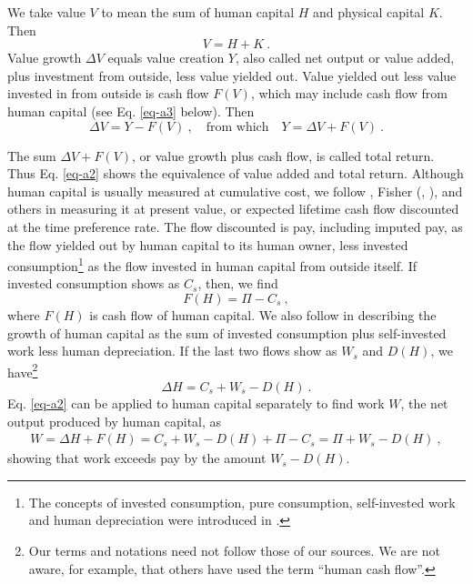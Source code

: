 %
We take value $V$ to mean the sum of human capital $H$ and physical capital $K$. Then
\begin{equation}
V = H + K\ . \label{eq-a1}
\end{equation}
%
Value growth $\Delta V$ equals value creation $Y$, also called net output or value added, plus investment from outside, less value yielded out. Value yielded out less value invested in from outside is cash flow $F(V)$, which may include cash flow from human capital (see Eq. \ref{eq-a3} below). Then
\begin{equation}
\Delta V = Y - F(V) \ , \quad \text{from which} \quad Y = \Delta V + F(V) \ . \label{eq-a2}
\end{equation}

The sum $\Delta V + F(V)$, or value growth plus cash flow, is called total return. Thus Eq. \eqref{eq-a2} shows the equivalence of value added and total return.
Although human capital is usually measured at cumulative cost, we follow \cite{petty1664verbum}, Fisher (\citeyear{fisher1907}, \citeyear{fisher1930}), \cite{mincer1958} and others in measuring it at present value, or expected lifetime cash flow discounted at the time preference rate. The flow discounted is pay, including imputed pay, as the flow yielded out by human capital to its human owner, less invested consumption\footnote{The concepts of invested consumption, pure consumption, self-invested work and human depreciation were introduced in \cite{schultz1961}.} as the flow invested in human capital from outside itself. If invested consumption shows as $C_s$, then, we find
\begin{equation}
F(H) = \Pi - C_s \ , \label{eq-a3}
\end{equation}
where $F(H)$ is cash flow of human capital. We also follow \cite{ben-porath1967} in describing the growth of human capital as the sum of invested consumption plus self-invested work less human depreciation. If the last two flows show as $W_s$ and $D(H)$, we have\footnote{Our terms and notations need not follow those of our sources. We are not aware, for example, that others have used the term “human cash flow”.}
\begin{equation}
\Delta H = C_s + W_s - D(H) \ . \label{eq-a4}
\end{equation}
Eq. \eqref{eq-a2} can be applied to human capital separately to find work $W$, the net output produced by human capital, as 
\begin{align}
W = \Delta H + F(H) = C_s + W_s - D(H) + \Pi - C_s = \Pi + W_s - D(H) \ , \label{eq-a5}
\end{align}
showing that work exceeds pay by the amount $W_s - D(H)$.

